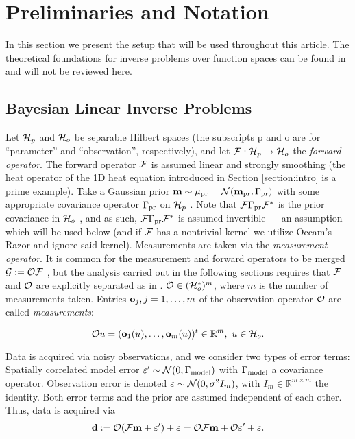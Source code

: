 \section{Preliminaries and Notation}\label{section:prelim}

In this section we present the setup that will be used throughout this
article. The theoretical foundations for inverse problems over
function spaces can be found in \cite{Stuart10} and will not be
reviewed here.


\subsection{Bayesian Linear Inverse Problems}\label{subsec:abstract OED}
Let $\mathcal{H}_p$ and $\mathcal{H}_o$ be separable Hilbert spaces (the subscripts p
and o are for ``parameter'' and ``observation'', respectively), and
let $\mathcal{F}: \mathcal{H}_p \to \mathcal{H}_o$ the \emph{forward operator}. The forward
operator $\mathcal{F}$ is assumed linear and strongly smoothing (the heat
operator of the 1D heat equation introduced in Section
\ref{section:intro} is a prime example). Take a Gaussian prior $\mathbf{m}
\sim \mu_{\textup{pr}} = \mathcal{N}(\mathbf{m}_{\textup{pr}} ,\Gamma_{\textup{pr}})$ with some appropriate covariance
operator $\Gamma_{\textup{pr}}$ on $\mathcal{H}_p$ \cite{Stuart10}. Note that $\mathcal{F} \Gamma_{\textup{pr}}
\mathcal{F}^*$ is the prior covariance in $\mathcal{H}_o$ \cite{Stuart10}, and as
such, $\mathcal{F} \Gamma_{\textup{pr}} \mathcal{F}^*$ is assumed invertible --- an assumption
which will be used below (and if $\mathcal{F}$ has a nontrivial kernel we
utilize Occam's Razor and ignore said kernel). Measurements are taken
via the \emph{measurement operator}. It is common for the measurement
and forward operators to be merged $\mathcal{G} := \mathcal{O} \mathcal{F}$
\cite{AlexanderianGloorGhattas14}, but the analysis carried out in the
following sections requires that $\mathcal{F}$ and $\mathcal{O}$ are explicitly
separated as in \cite{attia2022stochastic, cvetkovic2023choosing}.
$\mathcal{O} \in ( \mathcal{H}_o^* )^m$, where $m$ is the number of measurements
taken. Entries $\mathbf{o}_j, j=1,\dots,m$ of the observation operator
$\mathcal{O}$ are called \emph{measurements}:

\begin{equation*}%
  \obs u = (\meas_1(u), \dots, \meas_m(u) )^t \in \R^m,\ u \in \hilo.
\end{equation*}

Data is acquired via noisy observations, and we consider two types of
error terms: Spatially correlated model error $\varepsilon' \sim
\mathcal{N}(0,\Gamma_{\textup{model}})$ with $\Gamma_{\textup{model}}$ a covariance operator. Observation
error is denoted $\varepsilon \sim \mathcal{N}(0, \sigma^2 I_m)$, with $I_m \in
\mathbb{R}^{m \times m}$ the identity. Both error terms and the prior
are assumed independent of each other. Thus, data is acquired via
\begin{align}\label{eq:inverse problem}
  \mathbf{d} := \mathcal{O} (\mathcal{F} \mathbf{m} + \varepsilon') + \varepsilon = \mathcal{O} \mathcal{F} \mathbf{m} + \mathcal{O} \varepsilon' + \varepsilon.
\end{align}

